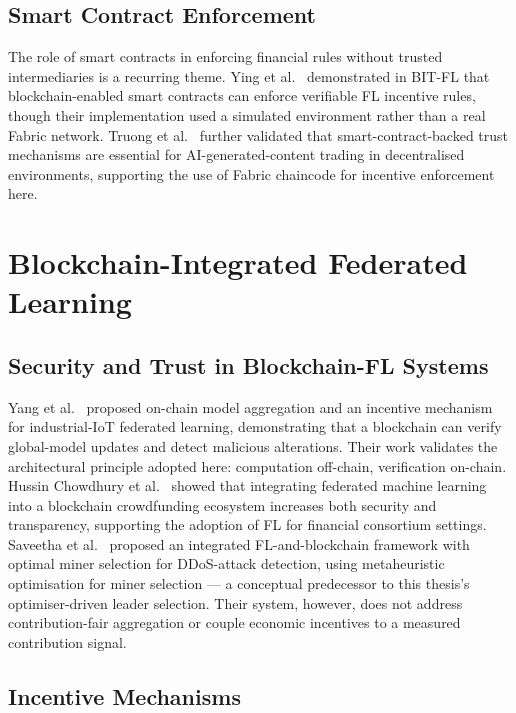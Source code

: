 \subsection{Smart Contract Enforcement}

The role of smart contracts in enforcing financial rules without trusted intermediaries is a recurring theme. Ying et al.~\cite{10713281} demonstrated in BIT-FL that blockchain-enabled smart contracts can enforce verifiable FL incentive rules, though their implementation used a simulated environment rather than a real Fabric network. Truong et al.~\cite{10466733} further validated that smart-contract-backed trust mechanisms are essential for AI-generated-content trading in decentralised environments, supporting the use of Fabric chaincode for incentive enforcement here.

\section{Blockchain-Integrated Federated Learning}

\subsection{Security and Trust in Blockchain-FL Systems}

Yang et al.~\cite{10701002} proposed on-chain model aggregation and an incentive mechanism for industrial-IoT federated learning, demonstrating that a blockchain can verify global-model updates and detect malicious alterations. Their work validates the architectural principle adopted here: computation off-chain, verification on-chain. Hussin Chowdhury et al.~\cite{10746050} showed that integrating federated machine learning into a blockchain crowdfunding ecosystem increases both security and transparency, supporting the adoption of FL for financial consortium settings. Saveetha et al.~\cite{10555270} proposed an integrated FL-and-blockchain framework with optimal miner selection for DDoS-attack detection, using metaheuristic optimisation for miner selection --- a conceptual predecessor to this thesis's optimiser-driven leader selection. Their system, however, does not address contribution-fair aggregation or couple economic incentives to a measured contribution signal.

\subsection{Incentive Mechanisms}

